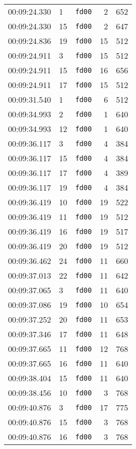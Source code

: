 \documentclass{article}
\begin{document}
\begin{longtable}{lllrr}
00:09:24.330 & 1 & \texttt{fd00} & 2 & 652 \\
00:09:24.330 & 15 & \texttt{fd00} & 2 & 647 \\
00:09:24.836 & 19 & \texttt{fd00} & 15 & 512 \\
00:09:24.911 & 3 & \texttt{fd00} & 15 & 512 \\
00:09:24.911 & 15 & \texttt{fd00} & 16 & 656 \\
00:09:24.911 & 17 & \texttt{fd00} & 15 & 512 \\
00:09:31.540 & 1 & \texttt{fd00} & 6 & 512 \\
00:09:34.993 & 2 & \texttt{fd00} & 1 & 640 \\
00:09:34.993 & 12 & \texttt{fd00} & 1 & 640 \\
00:09:36.117 & 3 & \texttt{fd00} & 4 & 384 \\
00:09:36.117 & 15 & \texttt{fd00} & 4 & 384 \\
00:09:36.117 & 17 & \texttt{fd00} & 4 & 389 \\
00:09:36.117 & 19 & \texttt{fd00} & 4 & 384 \\
00:09:36.419 & 10 & \texttt{fd00} & 19 & 522 \\
00:09:36.419 & 11 & \texttt{fd00} & 19 & 512 \\
00:09:36.419 & 16 & \texttt{fd00} & 19 & 517 \\
00:09:36.419 & 20 & \texttt{fd00} & 19 & 512 \\
00:09:36.462 & 24 & \texttt{fd00} & 11 & 660 \\
00:09:37.013 & 22 & \texttt{fd00} & 11 & 642 \\
00:09:37.065 & 3 & \texttt{fd00} & 11 & 640 \\
00:09:37.086 & 19 & \texttt{fd00} & 10 & 654 \\
00:09:37.252 & 20 & \texttt{fd00} & 11 & 653 \\
00:09:37.346 & 17 & \texttt{fd00} & 11 & 648 \\
00:09:37.665 & 11 & \texttt{fd00} & 12 & 768 \\
00:09:37.665 & 16 & \texttt{fd00} & 11 & 640 \\
00:09:38.404 & 15 & \texttt{fd00} & 11 & 640 \\
00:09:38.456 & 10 & \texttt{fd00} & 3 & 768 \\
00:09:40.876 & 3 & \texttt{fd00} & 17 & 775 \\
00:09:40.876 & 15 & \texttt{fd00} & 3 & 768 \\
00:09:40.876 & 16 & \texttt{fd00} & 3 & 768 \\

\end{longtable}
\end{document}
